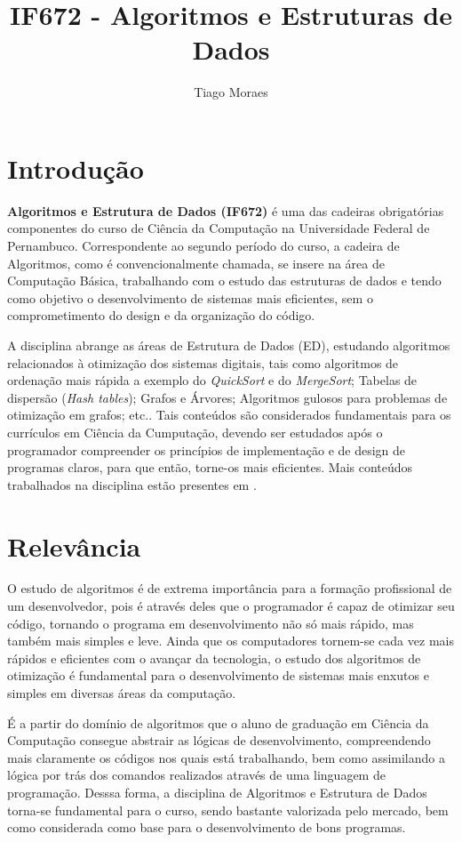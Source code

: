\documentclass[a4paper]{article}
\title{IF672 - Algoritmos e Estruturas de Dados}
\author{Tiago Moraes}
\begin{document}
\maketitle

\section{Introdução}
\textbf{Algoritmos e Estrutura de Dados (IF672)} é uma das cadeiras obrigatórias componentes do curso de Ciência da Computação na Universidade Federal de Pernambuco. Correspondente ao segundo período do curso, a cadeira de Algoritmos, como é convencionalmente chamada, se insere na área de Computação Básica, trabalhando com o estudo das estruturas de dados e tendo como objetivo o desenvolvimento de sistemas mais eficientes, sem o comprometimento do design e da organização do código.

A disciplina abrange as áreas de Estrutura de Dados (ED), estudando algoritmos relacionados à otimização dos sistemas digitais, tais como algoritmos de ordenação mais rápida a exemplo do \textit{QuickSort} e do \textit{MergeSort}; Tabelas de dispersão (\textit{Hash tables}); Grafos e Árvores; Algoritmos gulosos para problemas de otimização em grafos; etc.. Tais conteúdos são considerados fundamentais para os currículos em Ciência da Cumputação, devendo ser estudados após o programador compreender os princípios de implementação e de design de programas claros, para que então, torne-os mais eficientes. Mais conteúdos trabalhados na disciplina estão presentes em \cite{site}.

\section{Relevância}
O estudo de algoritmos é de extrema importância para a formação profissional de um desenvolvedor, pois é através deles que o programador é capaz de otimizar seu código, tornando o programa em desenvolvimento não só mais rápido, mas também mais simples e leve. Ainda que os computadores tornem-se cada vez mais rápidos e eficientes com o avançar da tecnologia, o estudo dos algoritmos de otimização é fundamental para o desenvolvimento de sistemas mais enxutos e simples em diversas áreas da computação. \cite{wiki}

É a partir do domínio de algoritmos que o aluno de graduação em Ciência da Computação consegue abstrair as lógicas de desenvolvimento, compreendendo mais claramente os códigos nos quais está trabalhando, bem como assimilando a lógica por trás dos comandos realizados através de uma linguagem de programação. Desssa forma, a disciplina de Algoritmos e Estrutura de Dados torna-se fundamental para o curso, sendo bastante valorizada pelo mercado, bem como considerada como base para o desenvolvimento de bons programas.
\end{document}
